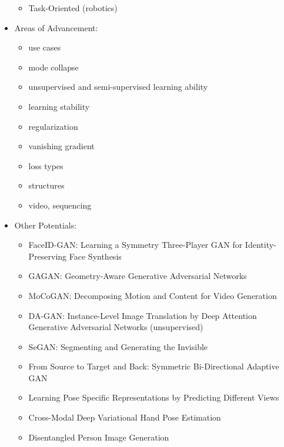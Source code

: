 \documentclass[11pt]{article}
\begin{document}
\begin{itemize}
\begin{itemize}
        \item Task-Oriented (robotics)
        
    \end{itemize}
    
    \item Areas of Advancement:
    \begin{itemize}
        \item use cases
        \item mode collapse
        \item unsupervised and semi-supervised learning ability
        \item learning stability
        \item regularization
        \item vanishing gradient
        \item loss types
        \item structures
        \item video, sequencing
    \end{itemize}






    \item Other Potentials:
    \begin{itemize}
        \item FaceID-GAN: Learning a Symmetry Three-Player GAN for Identity-Preserving Face Synthesis
        \item GAGAN: Geometry-Aware Generative Adversarial Networks
        \item MoCoGAN: Decomposing Motion and Content for Video Generation
        \item DA-GAN: Instance-Level Image Translation by Deep Attention Generative Adversarial Networks (unsupervised)
        \item SeGAN: Segmenting and Generating the Invisible \cite{ehsani2017segan}
        \item From Source to Target and Back: Symmetric Bi-Directional Adaptive GAN 
        \item Learning Pose Specific Representations by Predicting Different Views
        \item Cross-Modal Deep Variational Hand Pose Estimation
        \item Disentangled Person Image Generation
    \end{itemize}
        

\end{itemize}
\end{document}
